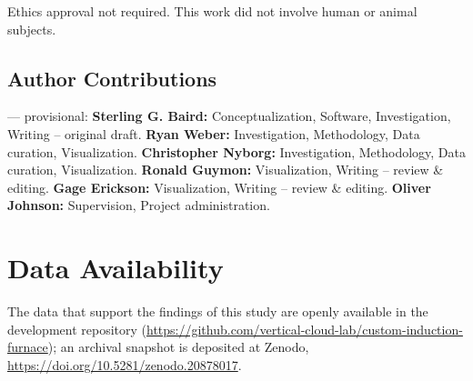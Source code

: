 \documentclass[%
 aip,
 rsi,%
 amsmath,amssymb,
 reprint,%
]{revtex4-2}
\newif\ifdraftnotes
\newcommand{\todo}[1]{\ifdraftnotes{\color{red}\textbf{[TODO: #1]}}\fi}
\begin{document}
Ethics approval not required. This work did not involve human or animal
subjects.

\subsection*{Author Contributions}

\todo{confirm CRediT roles} --- provisional: \textbf{Sterling G. Baird:}
Conceptualization, Software, Investigation, Writing -- original draft.
\textbf{Ryan Weber:} Investigation, Methodology, Data curation, Visualization.
\textbf{Christopher Nyborg:} Investigation, Methodology, Data curation,
Visualization.
\textbf{Ronald Guymon:} Visualization, Writing -- review \& editing.
\textbf{Gage Erickson:} Visualization, Writing -- review \& editing.
\textbf{Oliver Johnson:} Supervision, Project administration.

\section*{Data Availability}

The data that support the findings of this study are openly available in the
development repository
(\url{https://github.com/vertical-cloud-lab/custom-induction-furnace}); an
archival snapshot is deposited at Zenodo,
\href{https://doi.org/10.5281/zenodo.20878017}{https://doi.org/10.5281/zenodo.20878017}.


\end{document}
